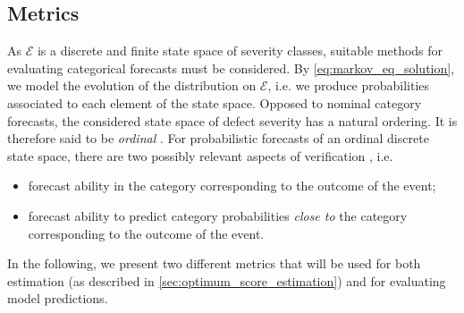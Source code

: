 \documentclass{article}
\begin{document}
\subsection{Metrics} \label{sec:error_metrics}
As $\mathcal{E}$ is a discrete and finite state space of severity classes, suitable methods for evaluating categorical forecasts must be considered. By \cref{eq:markov_eq_solution}, we model the evolution of the distribution on $\mathcal{E}$, i.e. we produce probabilities associated to each element of the state space.
Opposed to nominal category forecasts, the considered state space of defect severity has a natural ordering. It is therefore said to be \textit{ordinal} \citep{broecker2008a,hamill1997}.
For probabilistic forecasts of an ordinal discrete state space, there are two possibly relevant aspects of verification \citep{Weijs2010}, i.e. 
\begin{itemize}
\item forecast ability in the category corresponding to the outcome of the event;
\item forecast ability to predict category probabilities \textit{close to} the category corresponding to the outcome of the event.
\end{itemize} 
In the following, we present two different metrics that will be used for both estimation (as described in \cref{sec:optimum_score_estimation}) and for evaluating model predictions.

\end{document}
